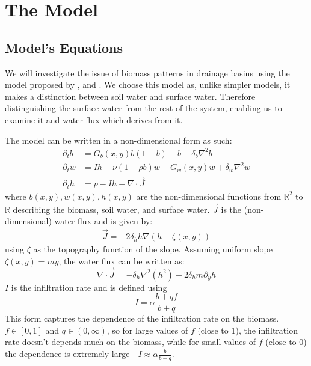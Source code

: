 \documentclass{article}
\numberwithin{equation}{section}
\begin{document}
\section{The Model}
\subsection{Model's Equations}
We will investigate the issue of biomass patterns in drainage basins using the model proposed by \cite{gilad_phys_2004}, and \cite{gilad_mathematical_2007}. We choose this model as, unlike simpler models, it makes a distinction between soil water and surface water. Therefore distinguishing the surface water from the rest of the system, enabling us to examine it and water flux which derives from it.

The model can be written in a non-dimensional form as such:
\begin{align}
    \partial_t b & = G_b(x,y) b(1-b) - b + \delta_b\nabla^2 b              \\
    \partial_t w & = Ih - \nu(1-\rho b)w - G_w(x,y)w + \delta_w \nabla^2 w \\
    \partial_t h & = p - Ih - \nabla \cdot \vec{J}
\end{align}
where $b(x,y),w(x,y),h(x,y)$ are the non-dimensional functions from $\mathbb{R}^2$ to $\mathbb{R}$ describing the biomass, soil water, and surface water. $\vec{J}$ is the (non-dimensional) water flux and is given by:
\begin{align}
    \label{eq:flux_def}
    \vec{J} =  -2\delta_h h\nabla\left(h+\zeta(x,y)\right)
\end{align}
using $\zeta$ as the topography function of the slope. Assuming uniform slope $\zeta(x,y)=my\label{eq:terrain}$, the water flux can be written as:
\begin{equation}
    \nabla \cdot \vec{J} = -\delta_h \nabla^2(h^2) - 2\delta_h m \partial_y h
\end{equation}
$I$ is the infiltration rate and is defined using
\begin{equation}
    I = \alpha \frac{b+qf}{b+q}
\end{equation}
This form captures the dependence of the infiltration rate on the biomass. $f\in[0,1]$ and $q\in(0,\infty)$, so for large values of $f$ (close to 1), the infiltration rate doesn't depends much on the biomass, while for small values of $f$ (close to 0) the dependence is extremely large - $I\approx \alpha\frac{b}{b+q}$.
\end{document}
